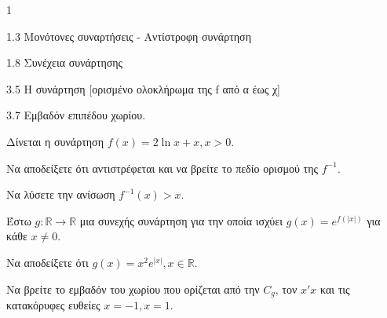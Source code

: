 \begin{ylh}{1}
    \item 1.3 Μονότονες συναρτήσεις - Αντίστροφη συνάρτηση
    \item 1.8 Συνέχεια συνάρτησης
    \item 3.5 Η συνάρτηση [ορισμένο ολοκλήρωμα της f από α έως χ]
    \item 3.7 Εμβαδόν επιπέδου χωρίου.
\end{ylh}
Δίνεται η συνάρτηση $f(x)=2\ln x+x, x>0$.
\begin{alist}
\item Να αποδείξετε ότι αντιστρέφεται και να βρείτε το πεδίο ορισμού της $f^{-1}$. 
\item Να λύσετε την ανίσωση $f^{-1}(x)>x$. 
\item Έστω $g: \mathbb{R} \to \mathbb{R}$ μια συνεχής συνάρτηση για την οποία ισχύει $g(x)=e^{f(|x|)}$ για κάθε $x \ne 0$.
    \begin{rlist}
    \item Να αποδείξετε ότι $g(x)=x^2 e^{|x|}, x \in \mathbb{R}$. 
    \item Να βρείτε το εμβαδόν του χωρίου που ορίζεται από την $C_g$, τον $x'x$ και τις κατακόρυφες ευθείες $x=-1, x=1$. 
    \end{rlist}
\end{alist}